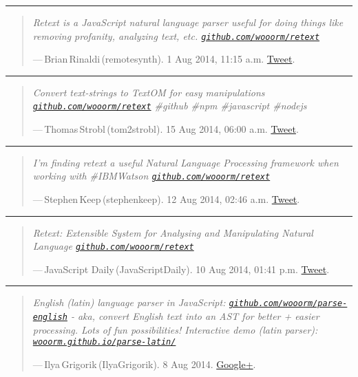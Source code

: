 \hrule

\begin{quote}
  \textit{Retext is a JavaScript natural language parser useful for doing
    things like removing profanity, analyzing text, etc.
    \href{https://github.com/wooorm/retext}{\nolinkurl{github.com/wooorm/retext}}
  }

  \medskip ---\,Brian\,Rinaldi\,(remotesynth). 1 Aug 2014, 11:15 a.m.
  \href{https://twitter.com/remotesynth/status/495271619737423872}{Tweet}.
\end{quote}

\hrule

\begin{quote}
  \textit{Convert text-strings to TextOM for easy manipulations
    \href{https://github.com/wooorm/retext}{\nolinkurl{github.com/wooorm/retext}}
    \#github \#npm \#javascript \#nodejs
  }

  \medskip ---\,Thomas\,Strobl\,(tom2strobl). 15 Aug 2014, 06:00 a.m.
  \href{https://twitter.com/tom2strobl/status/500265708866256896}{Tweet}.
\end{quote}

\hrule

\begin{quote}
  \textit{I'm finding retext a useful Natural Language Processing
    framework when working with \#IBMWatson
    \href{https://github.com/wooorm/retext}{\nolinkurl{github.com/wooorm/retext}}
  }

  \medskip ---\,Stephen\,Keep\,(stephenkeep). 12 Aug 2014, 02:46 a.m.
  \href{https://twitter.com/stephenkeep/status/499129742407532545}{Tweet}.
\end{quote}

\hrule

\begin{quote}
  \textit{Retext: Extensible System for Analysing and Manipulating Natural
    Language
    \href{https://github.com/wooorm/retext}{\nolinkurl{github.com/wooorm/retext}}
  }

  \medskip ---\,JavaScript Daily\,(JavaScriptDaily). 10 Aug 2014, 01:41 p.m.
  \href{https://twitter.com/JavaScriptDaily/status/498569727854522368}{Tweet}.
\end{quote}

\hrule

\begin{quote}
  \textit{English (latin) language parser in JavaScript:
    \href{https://github.com/wooorm/parse-english}{\nolinkurl{github.com/wooorm/parse-english}}
    - aka, convert English text into an AST for better + easier processing.
    Lots of fun possibilities!
    Interactive demo (latin parser):
    \href{http://wooorm.github.io/parse-latin/}{\nolinkurl{wooorm.github.io/parse-latin/}}
  }

  \medskip ---\,Ilya\,Grigorik\,(IlyaGrigorik). 8 Aug 2014.
  \href{https://plus.google.com/+IlyaGrigorik/posts/RR75ZLceDHU}{Google+}.
\end{quote}

